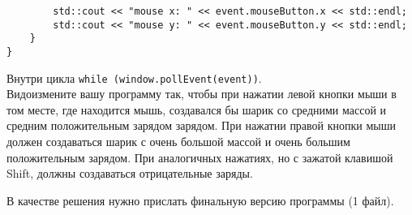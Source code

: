 \documentclass{article}
\begin{document}
\begin{itemize}
\begin{lstlisting}
        std::cout << "mouse x: " << event.mouseButton.x << std::endl;
        std::cout << "mouse y: " << event.mouseButton.y << std::endl;
    }
}
\end{lstlisting}
Внутри цикла \texttt{while (window.pollEvent(event))}.\\
Видоизмените вашу программу так, чтобы при нажатии левой кнопки мыши в том месте, где находится мышь, создавался бы шарик со средними массой и средним положительным зарядом зарядом. При нажатии правой кнопки мыши должен создаваться шарик с очень большой  массой и очень большим положительным зарядом. При аналогичных нажатиях, но с зажатой клавишой Shift, должны создаваться отрицательные заряды.
\end{itemize}
В качестве решения нужно прислать финальную версию программы (1 файл).
\end{document}
